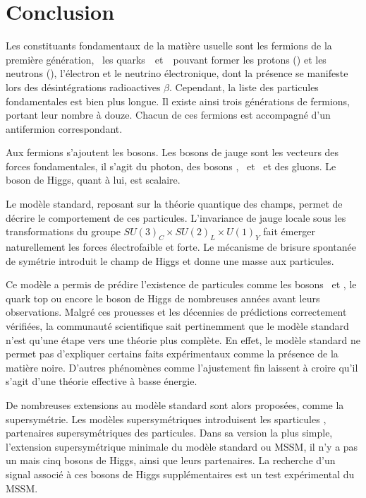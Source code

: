 \section{Conclusion}\label{chapter-MS-MSSM-section-conclusion}
Les constituants fondamentaux de la matière usuelle sont les fermions de la première génération, \ie\ les quarks~\quarku\ et~\quarkd\ pouvant former les protons (\quarku\quarku\quarkd) et les neutrons (\quarku\quarkd\quarkd), l'électron et le neutrino électronique, dont la présence se manifeste lors des désintégrations radioactives $\beta$.
Cependant, la liste des particules fondamentales est bien plus longue.
Il existe ainsi trois générations de fermions, portant leur nombre à douze.
Chacun de ces fermions est accompagné d'un antifermion correspondant.
\par Aux fermions s'ajoutent les bosons.
Les bosons de jauge sont les vecteurs des forces fondamentales, il s'agit du photon, des bosons \Wbosonplus, \Wbosonminus\ et \Zboson\ et des gluons.
Le boson de Higgs, quant à lui, est scalaire.
\par Le modèle standard, reposant sur la théorie quantique des champs, permet de décrire le comportement de ces particules.
L'invariance de jauge locale sous les transformations du groupe $SU(3)_C \times SU(2)_L \times U(1)_Y$ fait émerger naturellement les forces électrofaible et forte.
Le mécanisme de brisure spontanée de symétrie introduit le champ de Higgs et donne une masse aux particules.
\par Ce modèle a permis de prédire l'existence de particules comme les bosons \Wboson\ et \Zboson, le quark top ou encore le boson de Higgs de nombreuses années avant leurs observations.
Malgré ces prouesses et les décennies de prédictions correctement vérifiées, la communauté scientifique sait pertinemment que le modèle standard n'est qu'une étape vers une théorie plus complète.
En effet, le modèle standard ne permet pas d'expliquer certains faits expérimentaux comme la présence de la matière noire.
D'autres phénomènes comme l'ajustement fin laissent à croire qu'il s'agit d'une théorie effective à basse énergie.
\par De nombreuses extensions au modèle standard sont alors proposées, comme la supersymétrie.
Les modèles supersymétriques introduisent les \og sparticules \fg, partenaires supersymétriques des particules.
Dans sa version la plus simple, l'extension supersymétrique minimale du modèle standard ou MSSM, il n'y a pas un mais cinq bosons de Higgs, ainsi que leurs partenaires.
La recherche d'un signal associé à ces bosons de Higgs supplémentaires est un test expérimental du MSSM.
